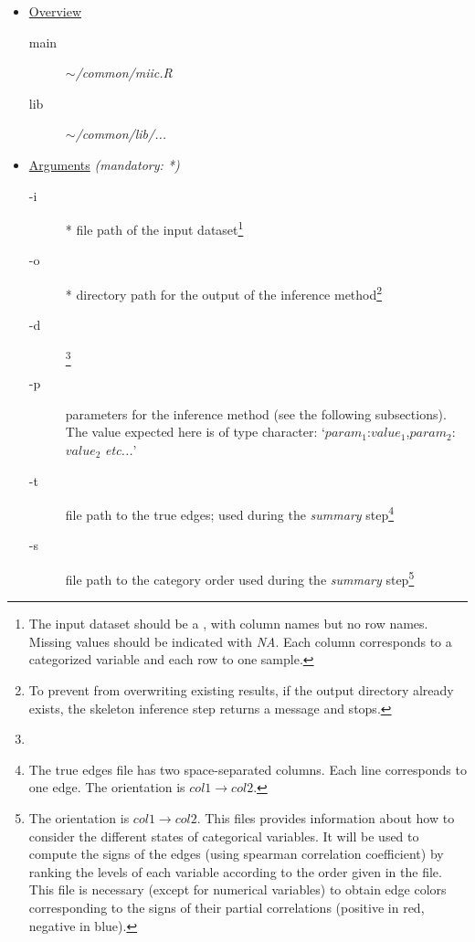 \documentclass[12pt]{article}
\begin{document}
\begin{itemize}

	\item[] \underline{Overview}

	\begin{description}
		\item[main] \textit{$\sim$/common/miic.R}
		\item[lib]	\textit{$\sim$/common/lib/...}
	\end{description}

	\item[] \underline{Arguments} \textit{\small{(mandatory: *)}}
	
	\begin{description}
		\item[-i]* file path of the input dataset\footnote{The input dataset should be a {\color{black}{tab separated table}}, with column names but no row names. Missing values should be indicated with \textit{NA}. Each column corresponds to a categorized variable and each row to one sample.}
		\item[-o]* directory path for the output of the inference method\footnote{To prevent from overwriting existing results, if the output directory already exists, the skeleton inference step returns a message and stops.}
		\item[-d] {}\footnote{{\color{black}{(1) skeleton, (2) orientation, (3) summary, (4) plot}}}
		\item[-p] parameters for the inference method (see the following subsections). The value expected here is of type character: `$param_{1}$:$value_{1}$,$param_{2}$:$value_{2}$ \textit{etc...}'
		\item[-t] file path to the true edges; used during the \textit{summary} step\footnote{The true edges file has two space-separated columns. Each line corresponds to one edge. The orientation is $col1 \rightarrow col2$.}
		\item[-s] file path to the category order used during the \textit{summary} step\footnote{The orientation is $col1 \rightarrow col2$. This files provides information about how to consider the different states of categorical variables. It will be used to compute the signs of the edges (using spearman correlation coefficient) by ranking the levels of each variable according to the order given in the file. This file is necessary (except for numerical variables) to obtain edge colors corresponding to the signs of their partial correlations (positive in red, negative in blue). 
}
\end{description}
\end{itemize}
\end{document}
